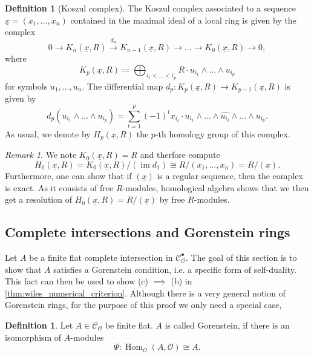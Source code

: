 \documentclass{article}
\theoremstyle{plain}%
\theoremstyle{definition}
\newtheorem{definition}[theorem]{Definition}
\theoremstyle{remark}
\newtheorem{remark}[theorem]{Remark}
\newcommand{\cob}{\mathcal{C}_\mathcal{O}^\bullet}
\newcommand{\co}{\mathcal{C}_\mathcal{O}}
\newcommand{\im}{\operatorname{im}}
\renewcommand{\hom}{\operatorname{Hom}}
\begin{document}
\begin{definition}[Koszul complex]\cites[ch. 5.3]{Darmon1995}[\S 16]{Matsumura1986}
    The Koszul complex associated to a sequence \(\underline{x} = (x_1, \dots, x_n)\) contained in the maximal ideal
    of a local ring is given by the complex
    \[
        0 \to K_n(\underline{x}, R) \xrightarrow{d_n} K_{n-1}(\underline{x}, R) \to \dots \to K_{0}(\underline{x},R) \to 0,
    \]
    where 
    \[
        K_p(\underline{x}, R) \coloneqq \bigoplus_{i_1 < \dots < i_p} R \cdot u_{i_1}\wedge\dots\wedge u_{i_p}
    \]
    for symbols \(u_1, \dots, u_n\). The differential map \(d_p\colon K_p(\underline{x}, R) \to K_{p-1}(\underline{x}, R)\)
    is given by
    \[
        d_p(u_{i_1}\wedge\dots\wedge u_{i_p}) = \sum_{t=1}^p(-1)^t x_{i_t} \cdot 
        u_{i_1} \wedge \dots \wedge \widehat{u_{i_t}}\wedge \dots \wedge u_{i_p}.
    \]
    As usual, we denote by \(H_p(\underline{x}, R)\) the \(p\)-th homology group of this complex.
\end{definition}

\begin{remark}\textup{\cites[proposition 5.13]{Darmon1995}[theorem 16.5 (i)]{Matsumura1986}}
    We note \(K_0(\underline{x}, R) = R\) and therfore compute
    \[
        H_0(\underline{x}, R) = K_0(\underline{x}, R)/(\im d_1) \cong R/(x_1, \dots, x_n) = R/(\underline{x}).
    \]
    Furthermore, one can show that if \((\underline{x})\) is a regular sequence, then the complex is exact.
    As it consists of free \(R\)-modules, homological algebra shows that we then get a resolution of
    \(H_0(\underline{x}, R) = R/(\underline{x})\) by free \(R\)-modules. 
\end{remark}

\subsection{Complete intersections and Gorenstein rings}
Let \(A\) be a finite flat complete intersection in \(\cob\). The goal of this section is to show that \(A\)
satisfies a Gorenstein condition, i.e. a specific form of self-duality.
This fact can then be used to show (c) \(\implies\) (b) in \cref{thm:wiles_numerical_criterion}.
Although there is a very general notion of Gorenstein rings, for
the purpose of this proof we only need a special case,
\begin{definition}
    Let \(A \in \co\) be finite flat. \(A\) is called Gorenstein, if there is an isomorphism of \(A\)-modules
    \[
        \Psi\colon \hom_\mathcal{O}(A, \mathcal{O}) \cong A.
    \]
\end{definition}
\end{document}
